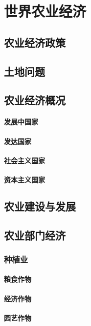 \documentclass[UTF8]{../../RepresentationUniverse}
\begin{document}
\chapter{世界农业经济}
\section{农业经济政策}
\section{土地问题}
\section{农业经济概况}
    \subsubsection{发展中国家}
    \subsubsection{发达国家}
    \subsubsection{社会主义国家}
    \subsubsection{资本主义国家}
\section{农业建设与发展}
\section{农业部门经济}
    \subsection{种植业}
        \subsubsection{粮食作物}
        \subsubsection{经济作物}
        \subsubsection{园艺作物}
\end{document}
